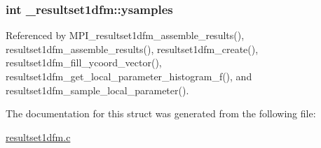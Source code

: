 \subsubsection[{\texorpdfstring{ysamples}{ysamples}}]{\setlength{\rightskip}{0pt plus 5cm}int \+\_\+resultset1dfm\+::ysamples}\hypertarget{struct__resultset1dfm_a21e88b0c502b9145a86a57a016b3daf6}{}\label{struct__resultset1dfm_a21e88b0c502b9145a86a57a016b3daf6}


Referenced by M\+P\+I\+\_\+resultset1dfm\+\_\+assemble\+\_\+results(), resultset1dfm\+\_\+assemble\+\_\+results(), resultset1dfm\+\_\+create(), resultset1dfm\+\_\+fill\+\_\+ycoord\+\_\+vector(), resultset1dfm\+\_\+get\+\_\+local\+\_\+parameter\+\_\+histogram\+\_\+f(), and resultset1dfm\+\_\+sample\+\_\+local\+\_\+parameter().



The documentation for this struct was generated from the following file\+:\begin{DoxyCompactItemize}
\item 
\hyperlink{resultset1dfm_8c}{resultset1dfm.\+c}\end{DoxyCompactItemize}
